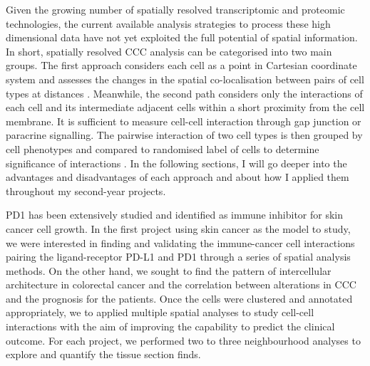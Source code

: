 Given the growing number of spatially resolved transcriptomic and proteomic technologies, the current available analysis strategies to process these high dimensional data have not yet exploited the full potential of spatial information. In short, spatially resolved CCC analysis can be categorised into two main groups. The first approach considers each cell as a point in Cartesian coordinate system and assesses the changes in the spatial co-localisation between pairs of cell types at distances \cite{arnol2019modeling,schurch2020coordinated}. Meanwhile, the second path considers only the interactions of each cell and its intermediate adjacent cells within a short proximity from the cell membrane. It is sufficient to measure cell-cell interaction through gap junction or paracrine signalling. The pairwise interaction of two cell types is then grouped by cell phenotypes and compared to randomised label of cells to determine significance of interactions  \cite{schapiro2017histocat}.  In the following sections, I will go deeper into the advantages and disadvantages of each approach and about how I applied them throughout my second-year projects.    

PD1 has been extensively studied and identified as immune inhibitor for skin cancer cell growth\cite{ishida1992induced,  tsai2014pd}. In the first project using skin cancer as the model to study, we were interested in finding and validating the immune-cancer cell interactions pairing the ligand-receptor PD-L1 and PD1 through a series of spatial analysis methods. On the other hand, we sought to find the pattern of intercellular architecture in colorectal cancer and the correlation between alterations in CCC and the prognosis for the patients. Once the cells were clustered and annotated appropriately, we to applied multiple spatial analyses to study cell-cell interactions with the aim of improving the capability to predict the clinical outcome. For each project, we performed two to three neighbourhood analyses to explore and quantify the tissue section finds.  

